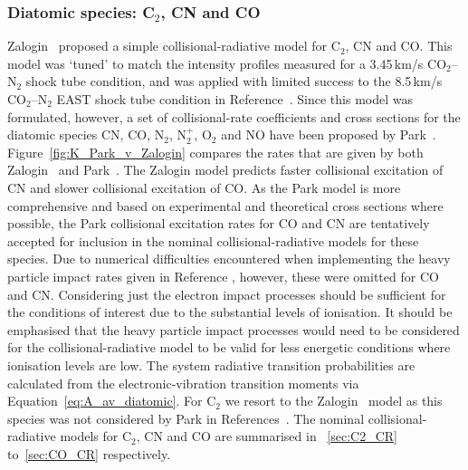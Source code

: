 \subsubsection{Diatomic species: C$_2$, CN and CO}

Zalogin~\cite{zalogin_2001} proposed a simple collisional-radiative model for C$_2$, CN and CO.
This model was `tuned' to match the intensity profiles measured for a 3.45\,km/s CO$_2$--N$_2$ shock tube condition, and was applied with limited success to the 8.5\,km/s CO$_2$--N$_2$ EAST shock tube condition in Reference~\cite{potter_2008c}.
Since this model was formulated, however, a set of collisional-rate coefficients and cross sections for the diatomic species CN, CO, N$_2$, N$_2^+$, O$_2$ and NO have been proposed by Park~\cite{park2008a, park2008b}.
Figure~\ref{fig:K_Park_v_Zalogin} compares the rates that are given by both Zalogin~\cite{zalogin_2001} and Park~\cite{park2008a, park2008b}.
The Zalogin model predicts faster collisional excitation of CN and slower collisional excitation of CO.
As the Park model is more comprehensive and based on experimental and theoretical cross sections where possible, the Park collisional excitation rates for CO and CN are tentatively accepted for inclusion in the nominal collisional-radiative models for these species.
Due to numerical difficulties encountered when implementing the heavy particle impact rates given in Reference \cite{park2008b}, however, these were omitted for CO and CN.
Considering just the electron impact processes should be sufficient for the conditions of interest due to the substantial levels of ionisation.
It should be emphasised that the heavy particle impact processes would need to be considered for the collisional-radiative model to be valid for less energetic conditions where ionisation levels are low.
The system radiative transition probabilities are calculated from the electronic-vibration transition moments via Equation~\ref{eq:A_av_diatomic}.
For C$_2$ we resort to the Zalogin~\cite{zalogin_2001} model as this species was not considered by Park in References~\cite{park2008a, park2008b}.
The nominal collisional-radiative models for C$_2$, CN and CO are summarised in \textsection~\ref{sec:C2_CR} to~\ref{sec:CO_CR} respectively.


